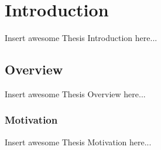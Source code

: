 \chapter{Introduction}
\label{chap_intro}


Insert awesome Thesis Introduction here...


\section{Overview}
\label{ch1:sec:overview}


Insert awesome Thesis Overview here...


\subsection{Motivation}
\label{ch1:subsec:motivation}

Insert awesome Thesis Motivation here...